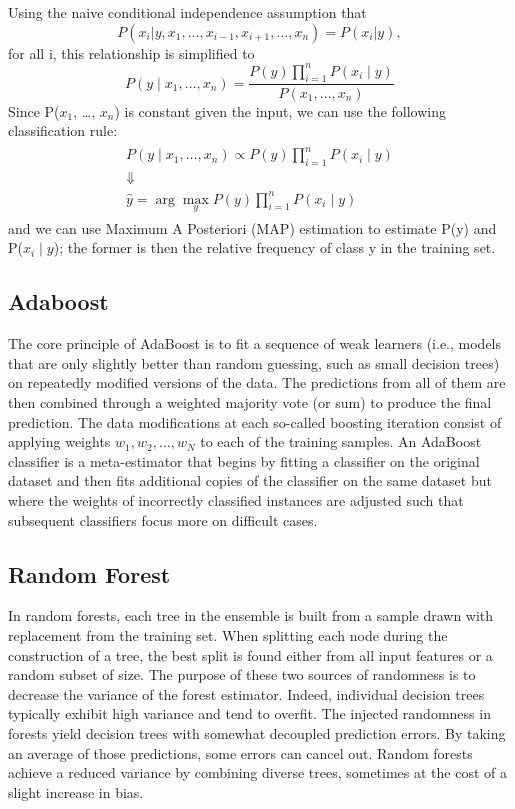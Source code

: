 \documentclass[sigconf]{acmart}
\begin{document}
Using the naive conditional independence assumption that
\begin{equation}
    P(x_i | y, x_1, \dots, x_{i-1}, x_{i+1}, \dots, x_n) = P(x_i | y),
\end{equation}
for all i, this relationship is simplified to
\begin{equation}
    P(y \mid x_1, \dots, x_n) = \frac{P(y) \prod_{i=1}^{n} P(x_i \mid y)}{P(x_1, \dots, x_n)}
\end{equation}
Since P($x_1$, \dots, $x_n$) is constant given the input, we can use the following classification rule:
\begin{align}
\begin{aligned}
    P(y \mid x_1, \dots, x_n) \propto P(y) \prod_{i=1}^{n} P(x_i \mid y)\\\Downarrow\\\hat{y} = \arg\max_y P(y) \prod_{i=1}^{n} P(x_i \mid y)
\end{aligned}
\end{align}
and we can use Maximum A Posteriori (MAP) estimation to estimate P(y) and P($x_i \mid y$); the former is then the relative frequency of class y in the training set.

\subsection{Adaboost}
The core principle of AdaBoost is to fit a sequence of weak learners (i.e., models that are only slightly better than random guessing, such as small decision trees) on repeatedly modified versions of the data. The predictions from all of them are then combined through a weighted majority vote (or sum) to produce the final prediction. The data modifications at each so-called boosting iteration consist of applying weights $w_1, w_2, …,  w_N$ to each of the training samples.\cite{freund1999short}
An AdaBoost classifier is a meta-estimator that begins by fitting a classifier on the original dataset and then fits additional copies of the classifier on the same dataset but where the weights of incorrectly classified instances are adjusted such that subsequent classifiers focus more on difficult cases.

\subsection{Random Forest}
In random forests, each tree in the ensemble is built from a sample drawn with replacement from the training set. When splitting each node during the construction of a tree, the best split is found either from all input features or a random subset of size\cite{liaw2002classification}.
The purpose of these two sources of randomness is to decrease the variance of the forest estimator. Indeed, individual decision trees typically exhibit high variance and tend to overfit. The injected randomness in forests yield decision trees with somewhat decoupled prediction errors. By taking an average of those predictions, some errors can cancel out. Random forests achieve a reduced variance by combining diverse trees, sometimes at the cost of a slight increase in bias.
\end{document}
